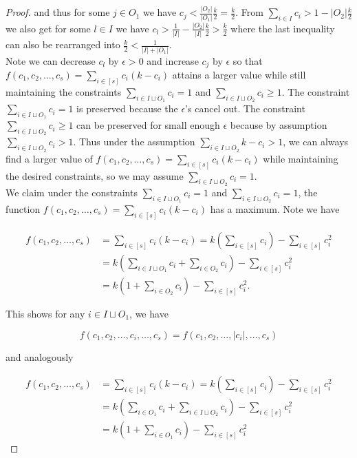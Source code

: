 \documentclass{article}
\begin{document}
\begin{proof}
\noindent
and thus for some $j \in O_1$ we have $c_j < \frac{|O_2|}{|O_1|} \frac{k}{2}  = \frac{k}{2}$. From $\sum_{i \in I} c_i > 1 - | O_2|\frac{k}{2}$ we also get for some $l \in I$ we have $c_l > \frac{1}{|I|} - \frac{|O_2|}{|I|}\frac{k}{2} > \frac{k}{2}$ where the last inequality can also be rearranged into $\frac{k}{2} < \frac{1}{|I|+|O_1|}$. \\

Note we can decrease $c_l$ by $\epsilon > 0$ and increase $c_j$ by $\epsilon$ so that $f(c_1,c_2,\ldots,c_{s}) = \sum_{i \in [s]} c_i(k-c_i)$ attains a larger value while still maintaining the constraints $\sum_{i \in I \sqcup O_1} c_i = 1$ and $\sum_{i \in I \sqcup O_2 } c_i \geq 1$. The constraint $\sum_{i \in I \sqcup O_1} c_i = 1$ is preserved because the $\epsilon$'s cancel out. The constraint $\sum_{i \in I \sqcup O_2 } c_i \geq 1$ can be preserved for small enough $\epsilon$ because by assumption $\sum_{i \in I \sqcup O_2 } c_i > 1$. Thus under the assumption $\sum_{i \in I \sqcup O_2 } k-c_i > 1$, we can always find a larger value of $f(c_1,c_2,\ldots,c_{s}) = \sum_{i \in [s]} c_i(k-c_i)$ while maintaining the desired constraints, so we may assume $\sum_{i \in I \sqcup O_2} c_i = 1$. \\

We claim under the constraints $\sum_{i \in I \sqcup O_1} c_i = 1$ and $\sum_{i \in I \sqcup O_2 } c_i = 1$, the function $f(c_1,c_2,\ldots,c_{s}) = \sum_{i \in [s]} c_i(k-c_i)$ has a maximum. Note we have

\begin{align*}
f(c_1,c_2,\ldots,c_{s}) &= \sum_{i \in [s]} c_i(k-c_i) = k \left( \sum_{i \in [s]} c_i \right) - \sum_{i \in [s]} c_i^2 \\
&= k \left( \sum_{i \in I \sqcup O_1} c_i + \sum_{i \in O_2} c_i \right) - \sum_{i \in [s]} c_i^2 \\ 
&= k \left( 1+ \sum_{i \in O_2} c_i \right) - \sum_{i \in [s]} c_i^2.
\end{align*}


\noindent
This shows for any $i \in I \sqcup O_1$, we have 

$$f(c_1,c_2, \ldots, c_i, \ldots, c_s) = f(c_1,c_2, \ldots, |c_i|, \ldots, c_s)$$

\noindent
and analogously 

\begin{align*}
f(c_1,c_2,\ldots,c_{s}) &= \sum_{i \in [s]} c_i(k-c_i) = k \left( \sum_{i \in [s]} c_i \right) - \sum_{i \in [s]} c_i^2 \\
&= k \left( \sum_{i \in O_1} c_i + \sum_{i \in I \sqcup O_2} c_i \right) - \sum_{i \in [s]} c_i^2 \\
&= k \left(1 +  \sum_{i \in O_1} c_i \right) - \sum_{i \in [s]} c_i^2
\end{align*}


\end{proof}
\end{document}
